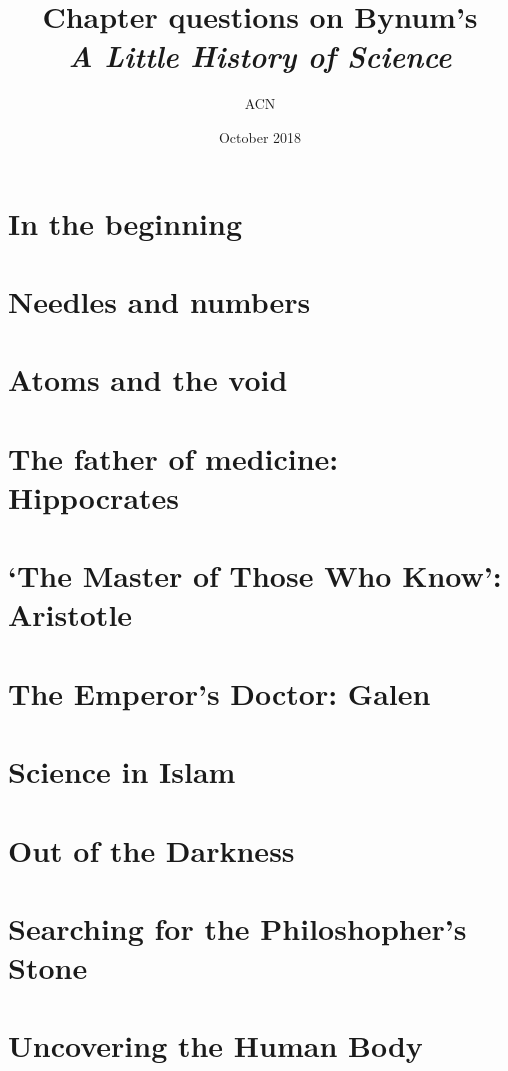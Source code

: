 \documentclass[a4paper,12pt]{article}
\title{Chapter questions on Bynum's\\ \emph{A Little History of Science}}
\author{ACN}
\date{October 2018}
\begin{document}
\maketitle

\section{In the beginning} %

\section{Needles and numbers} %

\section{Atoms and the void} %

\section{The father of medicine: Hippocrates} %

\section{`The Master of Those Who Know': Aristotle} %

\section{The Emperor's Doctor: Galen} %

\section{Science in Islam} %
	
\section{Out of the Darkness} %

\section{Searching for the Philoshopher's Stone} %

\section{Uncovering the Human Body} %
\end{document}
